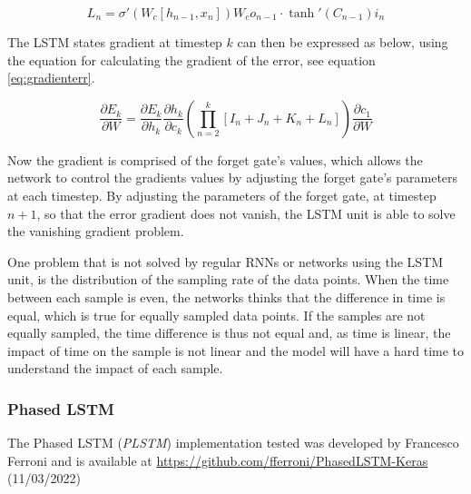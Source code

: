 \documentclass[../main.tex]{subfiles}
\begin{document}
\begin{equation} \label{eq:D}
L_n = \sigma'\left( W_c \left[ h_{n-1}, x_n \right]\right) W_c o_{n-1} \cdot \tanh'\left( C_{n-1}\right) i_n 
\end{equation}

The LSTM states gradient at timestep $k$ can then be expressed as below, using the equation for calculating the gradient of the error, see equation \ref{eq:gradienterr}.

$$\frac{\partial E_k}{\partial W} = \frac{\partial E_k}{\partial h_k}\frac{\partial h_k}{\partial c_k}\left( \prod_{n=2}^{k}\left[I_n + J_n + K_n + L_n \right] \right) \frac{\partial c_1}{\partial W}$$

Now the gradient is comprised of the forget gate's values, which allows the network to control the gradients values by adjusting the forget gate's parameters at each timestep. By adjusting the parameters of the forget gate, at timestep $n+1$, so that the error gradient does not vanish, the LSTM unit is able to solve the vanishing gradient problem.

One problem that is not solved by regular RNNs or networks using the LSTM unit, is the distribution of the sampling rate of the data points. When the time between each sample is even, the networks thinks that the difference in time is equal, which is true for equally sampled data points. If the samples are not equally sampled, the time difference is thus not equal and, as time is linear, the impact of time on the sample is not linear and the model will have a hard time to understand the impact of each sample.

\subsubsection{Phased LSTM}
The Phased LSTM (\textit{PLSTM}) implementation tested was developed by Francesco Ferroni and is available at \url{https://github.com/fferroni/PhasedLSTM-Keras} (11/03/2022)
\end{document}

